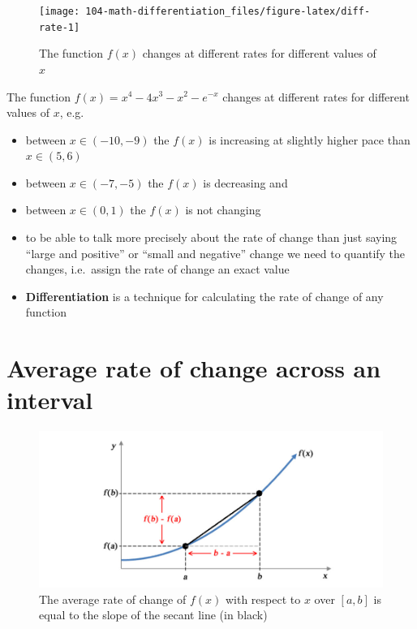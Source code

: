 \documentclass[
]{book}
\providecommand{\tightlist}{%
  \setlength{\itemsep}{0pt}\setlength{\parskip}{0pt}}
\theoremstyle{definition}
\theoremstyle{definition}
\theoremstyle{definition}
\theoremstyle{remark}
\begin{document}
\begin{figure}

{\centering \texttt{[image: 104-math-differentiation\_files/figure-latex/diff-rate-1]} 

}

\caption{The function $f(x)$ changes at different rates for different values of $x$}\label{fig:diff-rate}
\end{figure}

The function \(f(x) = x^4 - 4x^3 - x^2 - e^{-x}\) changes at different rates for different values of \(x\), e.g.~

\begin{itemize}
\tightlist
\item
  between \(x \in (-10, -9)\) the \(f(x)\) is increasing at slightly higher pace than \(x \in (5,6)\)
\item
  between \(x \in (-7, -5)\) the \(f(x)\) is decreasing and
\item
  between \(x \in (0, 1)\) the \(f(x)\) is not changing
\item
  to be able to talk more precisely about the rate of change than just saying ``large and positive'' or ``small and negative'' change we need to quantify the changes, i.e.~assign the rate of change an exact value
\item
  \textbf{Differentiation} is a technique for calculating the rate of change of any function
\end{itemize}

\hypertarget{average-rate-of-change-across-an-interval}{%
\section{Average rate of change across an interval}\label{average-rate-of-change-across-an-interval}}

\begin{figure}

{\centering \includegraphics{figures/precourse/math-differentiation-01} 

}

\caption{The average rate of change of $f(x)$ with respect to $x$ over $[a, b]$ is equal to the slope of the secant line (in black)}\label{fig:diff-01}
\end{figure}
\end{document}
